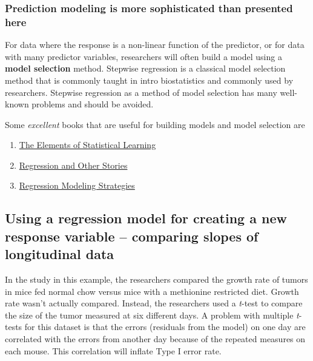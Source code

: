 \documentclass[]{book}
\providecommand{\tightlist}{%
  \setlength{\itemsep}{0pt}\setlength{\parskip}{0pt}}
\begin{document}
\hypertarget{prediction-modeling-is-more-sophisticated-than-presented-here}{%
\subsubsection{Prediction modeling is more sophisticated than presented here}\label{prediction-modeling-is-more-sophisticated-than-presented-here}}

For data where the response is a non-linear function of the predictor, or for data with many predictor variables, researchers will often build a model using a \textbf{model selection} method. Stepwise regression is a classical model selection method that is commonly taught in intro biostatistics and commonly used by researchers. Stepwise regression as a method of model selection has many well-known problems and should be avoided.

Some \emph{excellent} books that are useful for building models and model selection are

\begin{enumerate}
\def\labelenumi{\arabic{enumi}.}
\tightlist
\item
  \href{https://web.stanford.edu/~hastie/ElemStatLearn/}{The Elements of Statistical Learning}
\item
  \href{https://avehtari.github.io/ROS-Examples/}{Regression and Other Stories}
\item
  \href{http://hbiostat.org/doc/rms/4day.html}{Regression Modeling Strategies}
\end{enumerate}

\hypertarget{using-a-regression-model-for-creating-a-new-response-variable-comparing-slopes-of-longitudinal-data}{%
\subsection{Using a regression model for creating a new response variable -- comparing slopes of longitudinal data}\label{using-a-regression-model-for-creating-a-new-response-variable-comparing-slopes-of-longitudinal-data}}

In the study in this example, the researchers compared the growth rate of tumors in mice fed normal chow versus mice with a methionine restricted diet. Growth rate wasn't actually compared. Instead, the researchers used a \emph{t}-test to compare the size of the tumor measured at six different days. A problem with multiple \emph{t}-tests for this dataset is that the errors (residuals from the model) on one day are correlated with the errors from another day because of the repeated measures on each mouse. This correlation will inflate Type I error rate.
\end{document}
